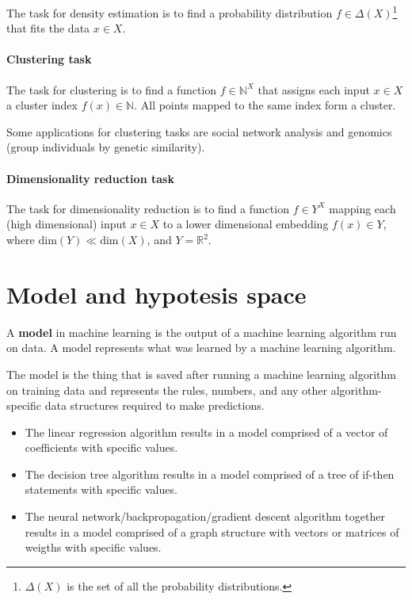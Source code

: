 The task for density estimation is to find a probability distribution \(f \in \Delta (X) \)\footnote{\(\Delta (X)\) is the set of all the probability distributions.} that fits the data \(x \in X\). 

\paragraph{Clustering task}
The task for clustering is to find a function \(f \in \mathbb{N}^X\) that assigns each input \(x \in X\) a cluster index \(f(x) \in \mathbb{N}\). All points mapped to the same index form a cluster.

Some applications for clustering tasks are social network analysis and genomics (group individuals by genetic similarity).

\paragraph{Dimensionality reduction task}
The task for dimensionality reduction is to find a function \(f \in Y^X\) mapping each (high dimensional) input \(x \in X\) to a lower dimensional embedding \(f(x) \in Y\), where \(\text{dim}(Y) \ll \text{dim}(X)\), and \(Y=\mathbb{R}^2\).

\section{Model and hypotesis space}
A \textbf{model} in machine learning is the output of a machine learning algorithm run on data. A model represents what was learned by a machine learning algorithm.

The model is the thing that is saved after running a machine learning algorithm on training data and represents the rules, numbers, and any other algorithm-specific data structures required to make predictions.

\begin{example}
    \begin{itemize}
        \item
        The linear regression algorithm results in a model comprised of a vector of coefficients with specific values.
        \item
        The decision tree algorithm results in a model comprised of a tree of if-then statements with specific values.
        \item
        The neural network/backpropagation/gradient descent algorithm together results in a model comprised of a graph structure with vectors or matrices of weigths with specific values.
    \end{itemize}
\end{example}

